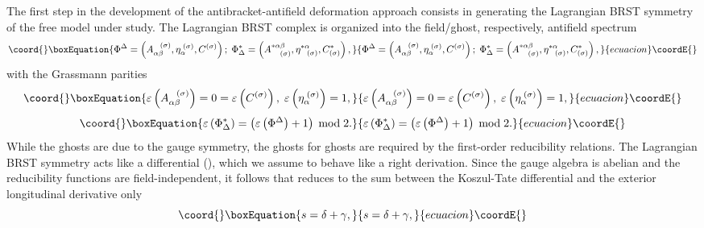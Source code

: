 \documentclass[a4paper,12pt]{article}
\begin{document}
The first step in the development of the antibracket-antifield deformation
approach consists in generating the Lagrangian BRST symmetry of the free
model under study. The Lagrangian BRST complex is organized into the
field/ghost, respectively, antifield spectrum 
\begin{equation}\coord{}\boxEquation{
\Phi ^{\Delta }=\left( A_{\alpha \beta }^{\;\;\;(\sigma )},\eta _{\alpha
}^{\;(\sigma )},C^{(\sigma )}\right) ;\;\Phi _{\Delta }^{*}=\left(
A_{\;\;\;\;(\sigma )}^{*\alpha \beta },\eta _{\;\;\;(\sigma )}^{*\alpha
},C_{(\sigma )}^{*}\right) ,  \label{fcol12}
}{
\Phi ^{\Delta }=\left( A_{\alpha \beta }^{\;\;\;(\sigma )},\eta _{\alpha
}^{\;(\sigma )},C^{(\sigma )}\right) ;\;\Phi _{\Delta }^{*}=\left(
A_{\;\;\;\;(\sigma )}^{*\alpha \beta },\eta _{\;\;\;(\sigma )}^{*\alpha
},C_{(\sigma )}^{*}\right) ,  }{ecuacion}\coordE{}\end{equation}
with the Grassmann parities 
\begin{equation}\coord{}\boxEquation{
\varepsilon \left( A_{\alpha \beta }^{\;\;\;(\sigma )}\right) =0=\varepsilon
\left( C^{(\sigma )}\right) ,\;\varepsilon \left( \eta _{\alpha }^{\;(\sigma
)}\right) =1,  \label{fcol13}
}{
\varepsilon \left( A_{\alpha \beta }^{\;\;\;(\sigma )}\right) =0=\varepsilon
\left( C^{(\sigma )}\right) ,\;\varepsilon \left( \eta _{\alpha }^{\;(\sigma
)}\right) =1,  }{ecuacion}\coordE{}\end{equation}
\begin{equation}\coord{}\boxEquation{
\varepsilon \left( \Phi _{\Delta }^{*}\right) =\left( \varepsilon \left(
\Phi ^{\Delta }\right) +1\right) \;\mathrm{mod}\;2.  \label{fcol15}
}{
\varepsilon \left( \Phi _{\Delta }^{*}\right) =\left( \varepsilon \left(
\Phi ^{\Delta }\right) +1\right) \;\mathrm{mod}\;2.  }{ecuacion}\coordE{}\end{equation}
While the ghosts \myHighlight{$\eta _{\alpha }^{\;(\sigma )}$}\coordHE{} are due to the gauge
symmetry, the ghosts for ghosts \coordHE{} are required by the
first-order reducibility relations. The Lagrangian BRST symmetry acts like a
differential \coordHE{} (\coordHE{}), which we assume to behave like a right
derivation. Since the gauge algebra is abelian and the reducibility
functions are field-independent, it follows that \coordHE{} reduces to the sum
between the Koszul-Tate differential \myHighlight{$\delta $}\coordHE{} and the exterior longitudinal
derivative \myHighlight{$\gamma $}\coordHE{} only 
\begin{equation}\coord{}\boxEquation{
s=\delta +\gamma ,  \label{fcol16}
}{
s=\delta +\gamma ,  }{ecuacion}\coordE{}\end{equation}
\end{document}
